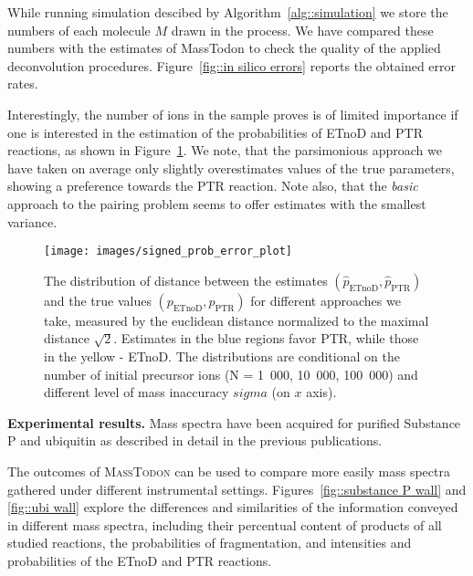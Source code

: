 \documentclass[journal=ancham, manuscript=article, layout=twocolumn]{achemso}
\begin{document}
While running simulation descibed by Algorithm~\ref{alg::simulation} we store the numbers of each molecule $M$ drawn in the process. We have compared these numbers with the estimates of MassTodon to check the quality of the applied deconvolution procedures. 
Figure~\ref{fig::in silico errors} reports the obtained error rates. 

Interestingly, the number of ions in the sample proves is of limited importance if one is interested in the estimation of the probabilities of ETnoD and PTR reactions, as shown in Figure~\ref{fig::signed prob error estimate}.
We note, that the parsimonious approach we have taken on average only slightly overestimates values of the true parameters, showing a preference towards the PTR reaction.
Note also, that the \textit{basic} approach to the pairing problem seems to offer estimates with the smallest variance. 

\begin{figure}[t]
	\centering
	\texttt{[image: images/signed\_prob\_error\_plot]}
	\caption{The distribution of distance between the estimates $(\hat{p}_\text{ETnoD}, \hat{p}_\text{PTR})$ and the true values $(p_\text{ETnoD}, p_\text{PTR})$ for different approaches we take, measured by the euclidean distance normalized to the maximal distance $\sqrt{2}$. Estimates in the blue regions favor PTR, while those in the yellow - ETnoD. The distributions are conditional on the number of initial precursor ions (N = 1~000, 10~000, 100~000) and different level of mass inaccuracy $sigma$ (on $x$ axis).}
    \label{fig::signed prob error estimate}
\end{figure}


\noindent\textbf{Experimental results.} 
Mass spectra have been acquired for purified Substance P and ubiquitin as described in detail in the previous publications\cite{lermyte2015understanding,lermyte2015characterization}. 

The outcomes of \textsc{MassTodon} can be used to compare more easily mass spectra gathered under different instrumental settings. 
Figures~\ref{fig::substance P wall} and \ref{fig::ubi wall} explore the differences and similarities of the information conveyed in different mass spectra, including their percentual content of products of all studied reactions, the probabilities of fragmentation, and intensities and probabilities of the ETnoD and PTR reactions.
\end{document}
